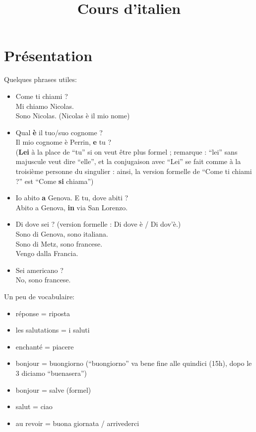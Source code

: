 \documentclass[twocolumn]{article}
\title{Cours d'italien}
\date{}
\newcommand{\hsp}{\hspace*{5mm}}
\newcommand{\tb}{\textbf}
\begin{document}
 
\maketitle

\section{Présentation}

Quelques phrases utiles:\\

\begin{itemize}
 \item Come ti chiami ? \\
\hsp Mi chiamo Nicolas.\\
\hsp Sono Nicolas. (Nicolas è il mio nome)
 \item Qual \tb{è} il tuo/suo cognome ?\\
\hspace*{5mm} Il mio cognome è Perrin, \tb{e} tu ?\\
(\textbf{Lei} à la place de ``tu'' si on veut être plus formel ; remarque : ``lei'' sans majuscule veut dire ``elle'', et la conjugaison avec ``Lei'' se fait comme à la troisième personne du singulier : ainsi, la version formelle de ``Come ti chiami ?'' est ``Come \tb{si} chiama'')
 \item Io abito \tb{a} Genova. E tu, dove abiti ?\\
\hsp Abito a Genova, \tb{in} via San Lorenzo.
 \item Di dove sei ? (version formelle : Di dove è / Di dov'è.)\\
\hsp Sono di Genova, sono italiana.\\
\hsp Sono di Metz, sono francese.\\
\hsp Vengo dalla Francia.
 \item Sei americano ?\\
\hsp No, sono francese.
\end{itemize}

Un peu de vocabulaire:
\begin{itemize}
 \item réponse = riposta
 \item les salutations = i saluti
 \item enchanté = piacere
 \item bonjour = buongiorno (``buongiorno'' va bene fine alle quindici (15h), dopo le 3 diciamo ``buenasera'')
 \item bonjour = salve (formel)
 \item salut = ciao
 \item au revoir = buona giornata / arrivederci
\end{itemize}
\end{document}
